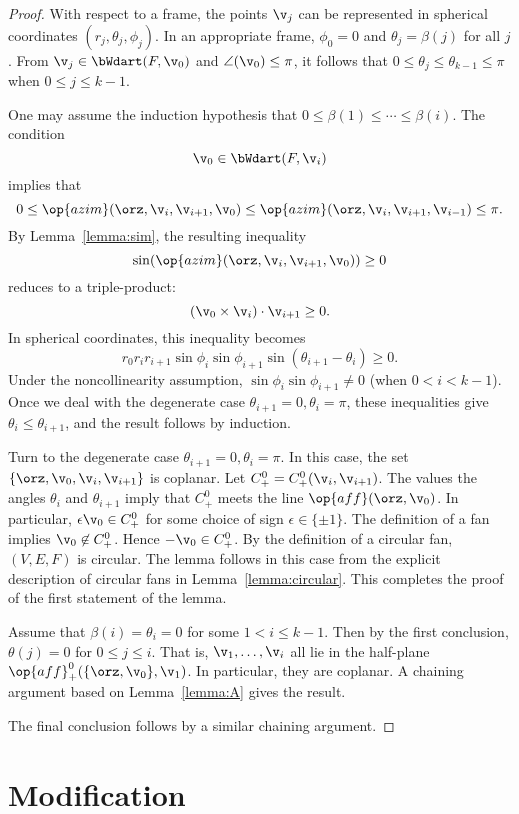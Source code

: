 \begin{proof}  
  With respect to a frame, the points $\v_j$ can be represented in
  spherical coordinates $(r_j,\theta_j,\phi_j)$.  In an appropriate
  frame, $\phi_0=0$ and $\theta_j=\beta(j)$ for all $j$.  From
  $\v_j\in \bWdart(F,\v_0)$ and $\angle(\v_0)\le\pi$, it follows that
  $0\le\theta_j\le\theta_{k-1}\le\pi$ when $0\le j\le k-1$.

One may assume the induction hypothesis that $0\le \beta(1)\le\cdots\le
\beta(i)$.  The condition
\[ 
\v_0\in \bWdart(F,\v_i)
\] 
implies that
\[ 
  0 \le \op{azim}(\orz,\v_i,\v_{i+1},\v_0)
\le \op{azim}(\orz,\v_i,\v_{i+1},\v_{i-1})\le\pi.
\] 
By Lemma~\ref{lemma:sim}, the resulting inequality
\[ 
\sin(\op{azim}(\orz,\v_i,\v_{i+1},\v_0))\ge 0
\] 
reduces to a triple-product:
\[ 
(\v_0 \times \v_i)\cdot \v_{i+1}\ge 0.
\] 
In spherical coordinates, this inequality becomes
\[ 
r_0r_ir_{i+1}\sin\phi_i\sin\phi_{i+1}\sin(\theta_{i+1}-\theta_i)\ge0.
\] 
Under the noncollinearity assumption, $\sin\phi_i\sin\phi_{i+1}\ne0$
(when $0< i < k-1$).  Once we deal with the degenerate
case $\theta_{i+1}=0,\theta_i=\pi$, these inequalities give
$\theta_i\le \theta_{i+1}$, and the result follows by induction.

Turn to the degenerate case $\theta_{i+1}=0,\theta_i=\pi$.  In this case,
the set $\{\orz,\v_0,\v_i,\v_{i+1}\}$ is coplanar.  Let $C^0_+=C^0_+(\v_i,\v_{i+1})$. 
The values the angles $\theta_i$ and $\theta_{i+1}$
imply that $C^0_+$ meets
the line $\op{aff}(\orz,\v_0)$. In particular, $\epsilon \v_0\in C^0_+$
for some choice of sign $\epsilon\in\{\pm 1\}$.
 The definition of a fan implies
$\v_0\not\in C^0_+$. Hence $-\v_0\in C^0_+$.
By the definition of a circular fan, $(V,E,F)$ is circular.
The lemma follows in this case from the explicit description of circular
fans in Lemma~\ref{lemma:circular}.  This completes the proof of the first
statement of the lemma.

Assume that $\beta(i)=\theta_i=0$ for some $1<i\le k-1$.  Then by the first
conclusion, $\theta(j)=0$ for $0\le j\le i$.  That is, 
$\v_1,\ldots,\v_i$ all lie in the half-plane
$\op{aff}^0_+(\{\orz,\v_0\},\v_1)$.  In particular, they are coplanar.
A chaining argument based on Lemma~\ref{lemma:A} gives the result.

The final conclusion follows by a similar chaining argument.
\end{proof}


\section{Modification}

